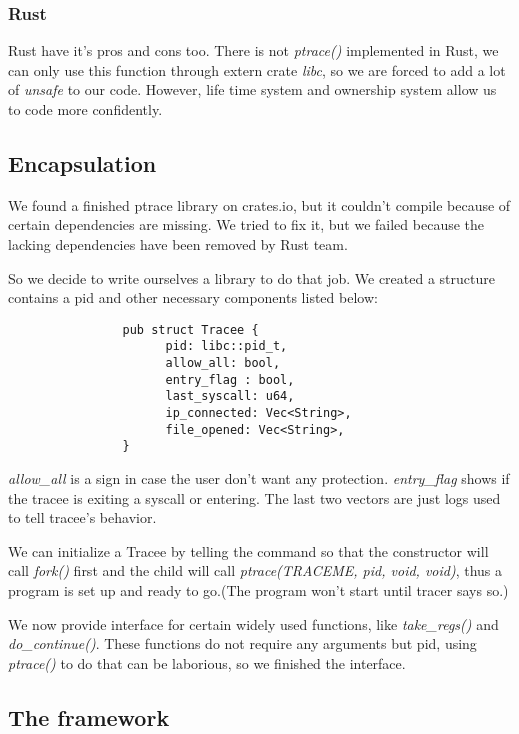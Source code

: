 \documentclass[conference,compsoc]{IEEEtran}
\begin{document}
		\subsubsection{Rust}
			\par
				Rust have it's pros and cons too. 
				There is not \emph{ptrace()} implemented in Rust, we can only use this function through extern crate \emph{libc}, so we are forced to add a lot of \emph{unsafe} to our code. 
				However, life time system and ownership system allow us to code more confidently.

	\subsection{Encapsulation}
		\par 
			We found a finished ptrace library on crates.io, but it couldn't compile because of certain dependencies are missing. 
			We tried to fix it, but we failed because the lacking dependencies have been removed by Rust team.
		\par
			So we decide to write ourselves a library to do that job. 
			We created a structure contains a pid and other necessary components listed below:
			\begin{verbatim}
				pub struct Tracee {
					  pid: libc::pid_t,
					  allow_all: bool,
					  entry_flag : bool,			
					  last_syscall: u64,
					  ip_connected: Vec<String>,
					  file_opened: Vec<String>,
				}
			\end{verbatim}
		\par
			\emph{allow\_all} is a sign in case the user don't want any protection. 
			\emph{entry\_flag} shows if the tracee is exiting a syscall or entering. 
			The last two vectors are just logs used to tell tracee's behavior.
		\par
			We can initialize a Tracee by telling the command so that the constructor will call \emph{fork()} first and the child will call \emph{ptrace(TRACEME, pid, void, void)}, thus a program is set up and ready to go.(The program won't start until tracer says so.)
		\par
			We now provide interface for certain widely used functions, like \emph{take\_regs()} and \emph{do\_continue()}. 
			These functions do not require any arguments but pid, using \emph{ptrace()} to do that can be laborious, so we finished the interface.
	\subsection{The framework}
\end{document}

